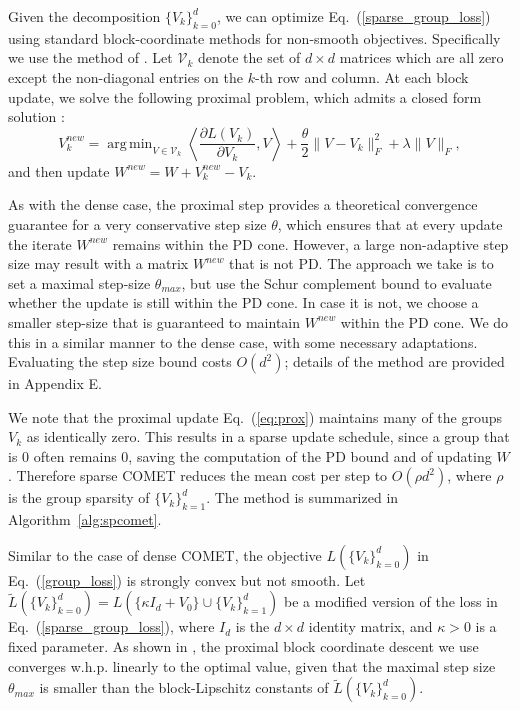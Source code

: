 \documentclass[twoside,11pt]{article}
\newcommand\mat[1]{{#1}}
\newcommand{\W}{\mat{W}}
\newcommand{\Vk}{\mat{V_k}}
\newcommand{\Vg}{\{\Vk\}_{k=0}^{d}} %
\newcommand{\Vgrc}{\{\Vk\}_{k=1}^{d}} %
\renewcommand{\eqref}[1]{Eq.~(\ref{#1})}
\DeclareMathOperator*{\argmin}{arg\,min}
\begin{document}
Given the decomposition $\Vg$, we can optimize \eqref{sparse_group_loss} using standard block-coordinate methods for non-smooth objectives. Specifically we use the method of \citet{richtarik2014iteration}. Let $\mathcal{V}_k$ denote the set of $d \times d$ matrices which are all zero except the non-diagonal entries on the $k$-th row and column. At each block update, we solve the following proximal problem, which admits a closed form solution \citep{bach2012optimization}:
\begin{equation}\label{eq:prox}
V_k^{new} = \argmin_{\mat{V} \in \mathcal{V}_k} \left\langle \frac{\partial{L (V_k)}}{\partial V_k}, \mat{V} \right\rangle + \frac{\theta}{2}\|V - V_k\|_F^2 + \lambda \|V\|_F,
\end{equation}
and then update $\W^{new} = \W + V_k^{new} - V_k$.

As with the dense case, the proximal step provides a theoretical convergence guarantee for a very conservative step size $\theta$, which ensures that at every update the iterate $\W^{new}$ remains within the PD cone.
However, a large non-adaptive step size may result with a matrix $\W^{new}$ that is not PD. The approach we take is to set a maximal step-size $\theta_{max}$, but use the Schur complement bound to evaluate whether the update is still within the PD cone. In case it is not, we choose a smaller step-size that is guaranteed to maintain $W^{new}$ within the PD cone. We do this in a similar manner to the dense case, with some necessary adaptations. Evaluating the step size bound costs $O(d^2)$; details of the method are provided in Appendix E. 

We note that the proximal update \eqref{eq:prox} maintains many of the groups $V_k$ as identically zero. This results in a sparse update schedule, since a group that is $0$ often remains $0$, saving the computation of the PD bound and of updating $\W$. Therefore sparse COMET reduces the mean cost per step to $O(\rho d^2)$, where $\rho$ is the group sparsity of $\Vgrc$. The method is summarized in Algorithm~\ref{alg:spcomet}.

Similar to the case of dense COMET, the objective $L(\Vg)$ in \eqref{group_loss} is strongly convex but not smooth. Let $\tilde{L}(\Vg) = L(\{\kappa I_d + V_0\} \cup \{V_k\}_{k=1}^d)$ be a modified version of the loss in \eqref{sparse_group_loss}, where $I_d$ is the $d \times d$ identity matrix, and $\kappa>0$ is a fixed parameter.
As shown in \cite[Theorem 7]{richtarik2014iteration}, the proximal block coordinate descent we use converges w.h.p. linearly to the optimal value, given that the maximal step size $\theta_{max}$ is smaller than the block-Lipschitz constants of $\tilde{L}(\Vg)$.
\end{document}
